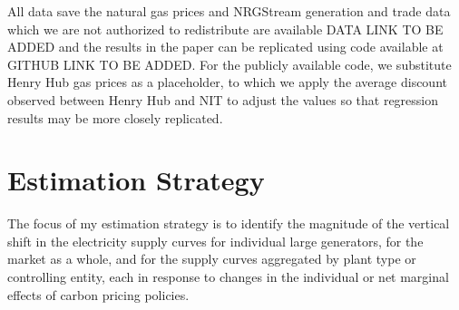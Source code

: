 \documentclass[12pt]{article}
\begin{document}
All data save the natural gas prices and NRGStream generation and trade data which we are not authorized to redistribute are available DATA LINK TO BE ADDED and the results in the paper can be replicated using code available at GITHUB LINK TO BE ADDED. For the publicly available code, we substitute Henry Hub gas prices as a placeholder, to which we apply the average discount observed between Henry Hub and NIT to adjust the values so that regression results may be more closely replicated.


\section{Estimation Strategy}\label{sec:est}
The focus of my estimation strategy is to identify the magnitude of the vertical shift in the electricity supply curves for individual large generators, for the market as a whole, and for the supply curves aggregated by plant type or controlling entity, each in response to changes in the individual or net marginal effects of carbon pricing policies.
\end{document}
